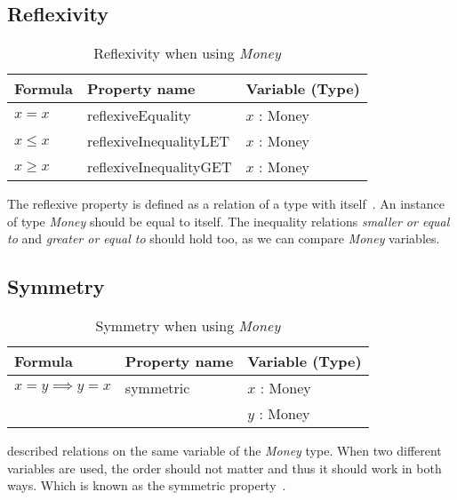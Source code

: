 \subsection*{Reflexivity}
\label{ssct:properties_reflexivity}
\begin{table}[!ht]
\centering
\begin{tabular}{lll}
\hline
                        \textbf{Formula} & \textbf{Property name} & \textbf{Variable (Type)} \\ \hline
\rowcolor[HTML]{EFEFEF} $x = x$     & reflexiveEquality      & $x$ : Money              \\
                        $x \leq x$       & reflexiveInequalityLET & $x$ : Money              \\
\rowcolor[HTML]{EFEFEF} $x \geq x$       & reflexiveInequalityGET & $x$ : Money              \\ \hline
\end{tabular}
\caption{Reflexivity when using \textit{Money}}
\label{tbl:ch4_money_reflexivity}
\end{table}
\FloatBarrier\noindent
The reflexive property is defined as a relation of a type with
itself~\cite{raftery2011perspective}. An instance of type \textit{Money} should
be equal to itself. The inequality relations \textit{smaller or equal to} and
\textit{greater or equal to} should hold too, as we can compare \textit{Money}
variables.

\subsection*{Symmetry}
\label{ssct:properties_symmetry}
\begin{table}[!ht]
\centering
\begin{tabular}{lll}
\hline
                        \textbf{Formula}                 & \textbf{Property name} & \textbf{Variable (Type)} \\ \hline
\rowcolor[HTML]{EFEFEF} $x = y \implies y = x$ & symmetric              & $x$ : Money              \\
\rowcolor[HTML]{EFEFEF}                                  &                        & $y$ : Money              \\ \hline
\end{tabular}
\caption{Symmetry when using \textit{Money}}
\label{tbl:ch4_money_symmetry}
\end{table}
\FloatBarrier\noindent
 described relations on the same variable
of the \textit{Money} type. When two different variables are used, the order
should not matter and thus it should work in both ways. Which is known as the
symmetric property~\cite{raftery2011perspective}.

